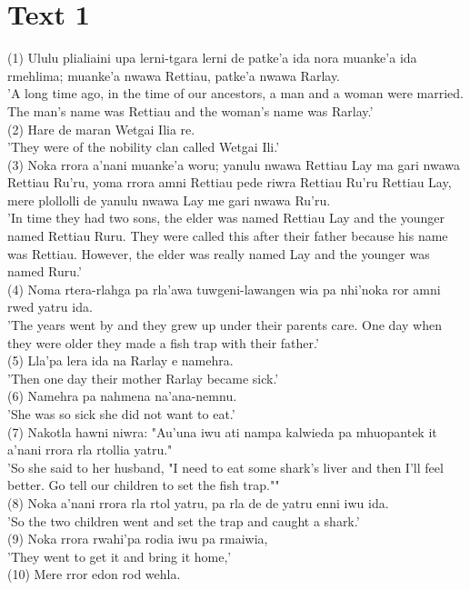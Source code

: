 \documentclass[10pt]{article}
\begin{document}
\section*{Text 1}
(1) Ululu plialiaini upa lerni-tgara lerni de patke'a ida nora muanke'a ida rmehlima; muanke'a nwawa Rettiau, patke'a nwawa Rarlay.\\
'A long time ago, in the time of our ancestors, a man and a woman were married. The man's name was Rettiau and the woman's name was Rarlay.'\\
(2) Hare de maran Wetgai Ilia re.\\
'They were of the nobility clan called Wetgai Ili.'\\
(3) Noka rrora a'nani muanke'a woru; yanulu nwawa Rettiau Lay ma gari nwawa Rettiau Ru'ru, yoma rrora amni Rettiau pede riwra Rettiau Ru'ru Rettiau Lay, mere plollolli de yanulu nwawa Lay me gari nwawa Ru'ru.\\
'In time they had two sons, the elder was named Rettiau Lay and the younger named Rettiau Ruru. They were called this after their father because his name was Rettiau. However, the elder was really named Lay and the younger was named Ruru.'\\
(4) Noma rtera-rlahga pa rla'awa tuwgeni-lawangen wia pa nhi'noka ror amni rwed yatru ida.\\
'The years went by and they grew up under their parents care. One day when they were older they made a fish trap with their father.'\\
(5) Lla'pa lera ida na Rarlay e namehra.\\
'Then one day their mother Rarlay became sick.'\\
(6) Namehra pa nahmena na'ana-nemnu.\\
'She was so sick she did not want to eat.'\\
(7) Nakotla hawni niwra: "Au'una iwu ati nampa kalwieda pa mhuopantek it a'nani rrora rla rtollia yatru."\\
'So she said to her husband, "I need to eat some shark's liver and then I'll feel better. Go tell our children to set the fish trap.""\\
(8) Noka a'nani rrora rla rtol yatru, pa rla de de yatru enni iwu ida.\\
'So the two children went and set the trap and caught a shark.'\\
(9) Noka rrora rwahi'pa rodia iwu pa rmaiwia,\\
'They went to get it and bring it home,'\\
(10) Mere rror edon rod wehla.\\
\end{document}
